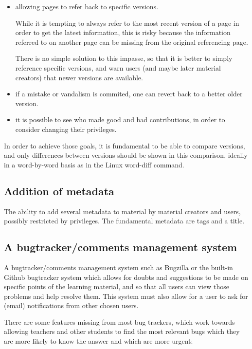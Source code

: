 \documentclass[12pt]{article}
\begin{document}
\begin{itemize}
  \item allowing pages to refer back to specific versions.
  
  While it is tempting to always refer to the most recent version of a page in order to get the latest information, this is risky because the information referred to on another page can be missing from the original referencing page.
  
  There is no simple solution to this impasse, so that it is better to simply reference specific versions, and warn users (and maybe later material creators) that newer versions are available.
  
  \item if a mistake or vandalism is commited, one can revert back to a better older version.
  
  \item it is possible to see who made good and bad contributions, in order to consider changing their privileges.
\end{itemize}

In order to achieve those goals, it is fundamental to be able to compare versions, and only differences between versions should be shown in this comparison, ideally in a word-by-word basis as in the Linux word-diff command.
  
\subsection{Addition of metadata}

The ability to add several metadata to material by material creators and users, possibly restricted by privileges. The fundamental metadata are tags and a title.
  
\subsection{A bugtracker/comments management system}

A bugtracker/comments management system such as Bugzilla or the built-in Github bugtracker system which allows for doubts and suggestions to be made on specific points of the learning material, and so that all users can view those problems and help resolve them. This system must also allow for a user to ask for (email) notifications from other chosen users.
  
There are some features missing from most bug trackers, which work towards allowing teachers and other students to find the most relevant bugs which they are more likely to know the answer and which are more urgent:
  
\end{document}
